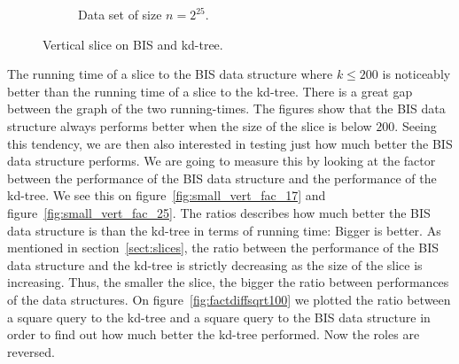 \begin{figure}[h]
{\begin{subfigure}[b]{0.68\textwidth}
        \caption{Data set of size $n=2^{25}$.}
        \label{fig:small_vert_25}
    \end{subfigure}
  }
    \caption{Vertical slice on BIS and kd-tree.}
    \label{fig:small_vert_17_25}
  
\end{figure}

The running time of a slice to the BIS data structure where $k \leq 200$ is noticeably better than the running time of a slice to the kd-tree. There is a great gap between the graph of the two running-times. The figures show that the BIS data structure always performs better when the size of the slice is below $200$. Seeing this tendency, we are then also interested in testing just how much better the BIS data structure performs. We are going to measure this by looking at the factor between the performance of the BIS data structure and the performance of the kd-tree. We see this on figure~\ref{fig:small_vert_fac_17} and figure~\ref{fig:small_vert_fac_25}. The ratios describes how much better the BIS data structure is than the kd-tree in terms of running time: Bigger is better. As mentioned in section~\ref{sect:slices}, the ratio between the performance of the BIS data structure and the kd-tree is strictly decreasing as the size of the slice is increasing. Thus, the smaller the slice, the bigger the ratio between performances of the data structures. On figure~\ref{fig:factdiffsqrt100} we plotted the ratio between a square query to the kd-tree and a square query to the BIS data structure in order to find out how much better the kd-tree performed. Now the roles are reversed.

